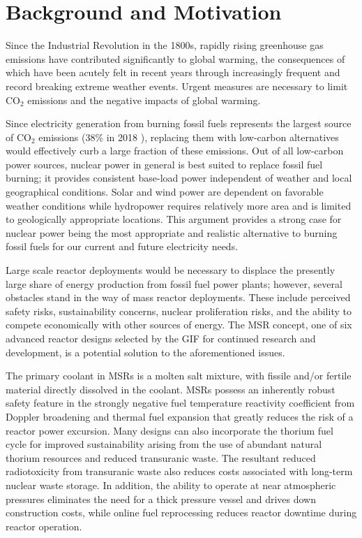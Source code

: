 \section{Background and Motivation}

Since the Industrial Revolution in the 1800s, rapidly rising greenhouse gas
emissions have contributed significantly to global warming, the consequences
of which have been acutely felt in recent years through increasingly frequent
and record breaking extreme weather events. Urgent measures are necessary to
limit CO$_2$ emissions and the negative impacts of global warming.

Since electricity generation from burning fossil fuels represents the
largest source of CO$_2$ emissions (38\% in 2018 \cite{iea_global_2019}),
replacing them with low-carbon
alternatives would effectively curb a large fraction of these emissions. Out
of all low-carbon power sources, nuclear power in general is best suited to
replace fossil fuel burning; it provides consistent base-load
power independent of weather and local geographical conditions. Solar and wind
power are dependent on favorable weather conditions while hydropower requires
relatively more area and is limited to geologically appropriate locations.
This argument provides a strong case for nuclear power being the most
appropriate and realistic alternative to burning fossil fuels for our current
and future electricity needs.

Large scale reactor deployments would be necessary to displace the
presently large share of energy production from fossil fuel power plants;
however, several obstacles stand in the way of mass reactor deployments. These
include perceived safety risks, sustainability concerns, nuclear proliferation
risks, and the ability to compete economically with other sources of energy.
The \gls{MSR} concept, one of six advanced reactor designs
selected by the \gls{GIF} \cite{gif_technology_2002} for continued research
and development, is a potential solution to the aforementioned issues.

The primary coolant in MSRs is a molten salt mixture,
with fissile and/or fertile material directly dissolved in the coolant.
MSRs possess an inherently robust safety feature in the
strongly negative fuel temperature reactivity coefficient from Doppler
broadening and thermal fuel expansion that greatly reduces
the risk of a reactor power excursion. Many designs can also incorporate the
thorium fuel cycle for improved sustainability arising from the use of
abundant natural thorium resources and reduced transuranic waste. The
resultant reduced radiotoxicity from transuranic waste also reduces costs
associated with long-term nuclear waste storage. In addition, the ability to
operate at near atmospheric pressures eliminates the need for a thick pressure
vessel and drives down construction costs, while online fuel reprocessing
reduces reactor downtime during reactor operation.

